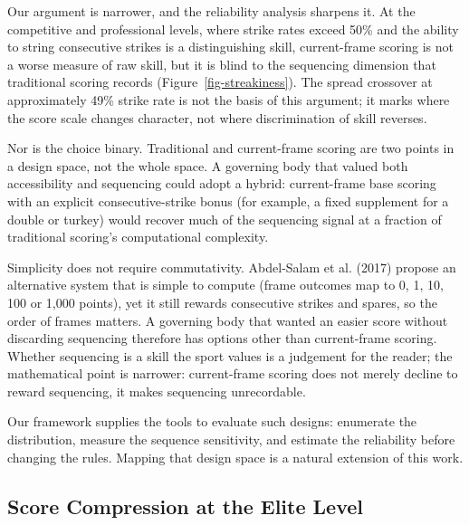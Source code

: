 \documentclass[
  letterpaper,
  DIV=11,
  numbers=noendperiod]{scrartcl}
\begin{document}
Our argument is narrower, and the reliability analysis sharpens it. At
the competitive and professional levels, where strike rates exceed 50\%
and the ability to string consecutive strikes is a distinguishing skill,
current-frame scoring is not a worse measure of raw skill, but it is
blind to the sequencing dimension that traditional scoring records
(Figure~\ref{fig-streakiness}). The spread crossover at approximately
49\% strike rate is not the basis of this argument; it marks where the
score scale changes character, not where discrimination of skill
reverses.

Nor is the choice binary. Traditional and current-frame scoring are two
points in a design space, not the whole space. A governing body that
valued both accessibility and sequencing could adopt a hybrid:
current-frame base scoring with an explicit consecutive-strike bonus
(for example, a fixed supplement for a double or turkey) would recover
much of the sequencing signal at a fraction of traditional scoring's
computational complexity.

Simplicity does not require commutativity. Abdel-Salam et al. (2017)
propose an alternative system that is simple to compute (frame outcomes
map to 0, 1, 10, 100 or 1,000 points), yet it still rewards consecutive
strikes and spares, so the order of frames matters. A governing body
that wanted an easier score without discarding sequencing therefore has
options other than current-frame scoring. Whether sequencing is a skill
the sport values is a judgement for the reader; the mathematical point
is narrower: current-frame scoring does not merely decline to reward
sequencing, it makes sequencing unrecordable.

Our framework supplies the tools to evaluate such designs: enumerate the
distribution, measure the sequence sensitivity, and estimate the
reliability before changing the rules. Mapping that design space is a
natural extension of this work.

\subsection{Score Compression at the Elite
Level}\label{score-compression-at-the-elite-level}
\end{document}
